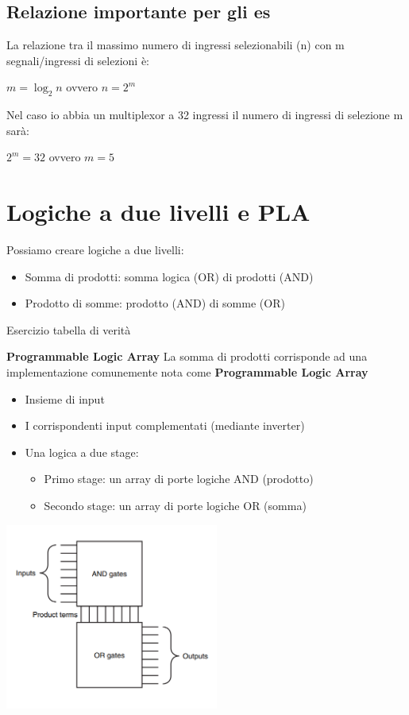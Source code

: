 \documentclass[12pt, a4paper, openany]{book}
\begin{document}
\subsection{Relazione importante per gli es}
La relazione tra il massimo numero di ingressi selezionabili (n) con m segnali/ingressi 
di selezioni è:
\begin{center}
    $m = \log_2 n$
    ovvero
    $n = 2^m$
\end{center}
Nel caso io abbia un multiplexor a 32 ingressi il numero di ingressi di selezione m sarà:
\begin{center}
    $2^m = 32$ ovvero $m = 5$
\end{center}


\section{Logiche a due livelli e PLA}
Possiamo creare logiche a due livelli:
\begin{itemize}
    \item Somma di prodotti: somma logica (OR) di prodotti (AND)
    \item Prodotto di somme: prodotto (AND) di somme (OR)
\end{itemize}
Esercizio tabella di verità

\textbf{Programmable Logic Array}
La somma di prodotti corrisponde ad una implementazione comunemente nota come \textbf{Programmable Logic Array}
\begin{itemize}
    \item Insieme di input
    \item I corrispondenti input complementati (mediante inverter)
    \item Una logica a due stage:
    \begin{itemize}
        \item Primo stage: un array di porte logiche AND (prodotto)
        \item Secondo stage: un array di porte logiche OR (somma)
    \end{itemize}
\end{itemize}
\begin{center}
    \includegraphics[width=70mm, scale=0.6]{ex_pla.png}    
\end{center}
\end{document}

